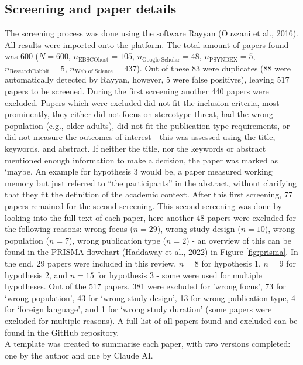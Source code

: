 \documentclass[
  stu,floatsintext]{apa7}
\begin{document}
\subsection{Screening and paper details}\label{screening-and-paper-details}

The screening process was done using the software Rayyan (Ouzzani et al., 2016). All results were imported onto the platform.
The total amount of papers found was 600 (\(N = 600\), \(n_{\text{EBSCOhost}} = 105\), \(n_{\text{Google Scholar}} = 48\), \(n_{\text{PSYNDEX}} = 5\), \(n_{\text{ResearchRabbit}} = 5\), \(n_{\text{Web of Science}} = 437\)). Out of these 83 were duplicates (88 were automatically detected by Rayyan, however, 5 were false positives), leaving 517 papers to be screened. During the first screening another 440 papers were excluded.
Papers which were excluded did not fit the inclusion criteria, most prominently, they either did not focus on stereotype threat, had the wrong population (e.g., older adults), did not fit the publication type requirements, or did not measure the outcomes of interest - this was assessed using the title, keywords, and abstract. If neither the title, nor the keywords or abstract mentioned enough information to make a decision, the paper was marked as `maybe.
An example for hypothesis 3 would be, a paper measured working memory but just referred to ``the participants'' in the abstract, without clarifying that they fit the definition of the academic context. After this first screening, 77 papers remained for the second screening.
This second screening was done by looking into the full-text of each paper, here another 48 papers were excluded for the following reasons: wrong focus (\(n = 29\)), wrong study design (\(n = 10\)), wrong population (\(n = 7\)), wrong publication type (\(n = 2\)) - an overview of this can be found in the PRISMA flowchart (Haddaway et al., 2022) in Figure \ref{fig:prisma}.
In the end, 29 papers were included in this review, \(n = 8\) for hypothesis 1, \(n = 9\) for hypothesis 2, and \(n = 15\) for hypothesis 3 - some were used for multiple hypotheses. Out of the 517 papers, 381 were excluded for 'wrong focus', 73 for `wrong population', 43 for `wrong study design', 13 for wrong publication type, 4 for `foreign language', and 1 for `wrong study duration' (some papers were excluded for multiple reasons). A full list of all papers found and excluded can be found in the GitHub repository.\\
A template was created to summarise each paper, with two versions completed: one by the author and one by Claude AI.
\end{document}
